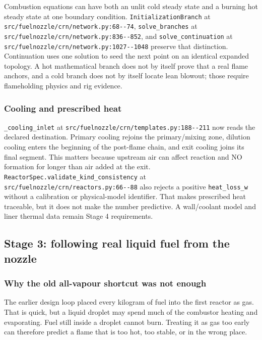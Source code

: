 \documentclass[11pt]{article}
\newcommand{\code}[1]{\nolinkurl{#1}}
\newcommand{\srcline}[2]{\nolinkurl{#1:#2}}
\begin{document}
Combustion equations can have both an unlit cold steady state and a burning hot steady state
at one boundary condition. \code{InitializationBranch} at
\srcline{src/fuelnozzle/crn/network.py}{68--74}, \code{solve\_branches} at
\srcline{src/fuelnozzle/crn/network.py}{836--852}, and \code{solve\_continuation} at
\srcline{src/fuelnozzle/crn/network.py}{1027--1048} preserve that distinction. Continuation
uses one solution to seed the next point on an identical expanded topology. A hot mathematical
branch does not by itself prove that a real flame anchors, and a cold branch does not by
itself locate lean blowout; those require flameholding physics and rig evidence.

\subsubsection{Cooling and prescribed heat}

\code{\_cooling\_inlet} at
\srcline{src/fuelnozzle/crn/templates.py}{188--211} now reads the declared destination.
Primary cooling rejoins the primary/mixing zone, dilution cooling enters the beginning of the
post-flame chain, and exit cooling joins its final segment. This matters because upstream air
can affect reaction and NO formation for longer than air added at the exit.
\code{ReactorSpec.validate\_kind\_consistency} at
\srcline{src/fuelnozzle/crn/reactors.py}{66--88} also rejects a positive
\code{heat\_loss\_w} without a calibration or physical-model identifier. That makes prescribed
heat traceable, but it does not make the number predictive. A wall/coolant model and liner
thermal data remain Stage 4 requirements.

\subsection{Stage 3: following real liquid fuel from the nozzle}

\subsubsection{Why the old all-vapour shortcut was not enough}

The earlier design loop placed every kilogram of fuel into the first reactor as gas. That is
quick, but a liquid droplet may spend much of the combustor heating and evaporating. Fuel still
inside a droplet cannot burn. Treating it as gas too early can therefore predict a flame that is
too hot, too stable, or in the wrong place.
\end{document}
